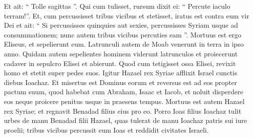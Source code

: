 \begin{biblechapter}
\begin{biblechapter}
\begin{biblechapter}
\begin{biblechapter}
\begin{biblechapter}
\begin{biblechapter}
\begin{biblechapter}
\begin{biblechapter}
\begin{biblechapter}
\begin{biblechapter}
\begin{biblechapter}
\begin{biblechapter}
\begin{biblechapter}
\verse Et ait: “ Tolle sagittas ”. Qui cum tulisset, rursum dixit ei: “ Percute iaculo terram!”. Et, cum percussisset tribus vicibus et stetisset, 
\verse iratus est contra eum vir Dei et ait: “ Si percussisses quinquies aut sexies, percussisses Syriam usque ad consummationem; nunc autem tribus vicibus percuties eam ”.
 \verse Mortuus est ergo Eliseus, et sepelierunt eum. Latrunculi autem de Moab venerunt in terra in ipso anno. 
\verse Quidam autem sepelientes hominem viderunt latrunculos et proiecerunt cadaver in sepulcro Elisei et abierunt. Quod cum tetigisset ossa Elisei, revixit homo et stetit super pedes suos.
 \verse Igitur Hazael rex Syriae afflixit Israel cunctis diebus Ioachaz. 
\verse Et misertus est Dominus eorum et reversus est ad eos propter pactum suum, quod habebat cum Abraham, Isaac et Iacob, et noluit disperdere eos neque proicere penitus usque in praesens tempus. 
\verse Mortuus est autem Hazael rex Syriae; et regnavit Benadad filius eius pro eo. 
\verse Porro Ioas filius Ioachaz tulit urbes de manu Benadad filii Hazael, quas tulerat de manu Ioachaz patris sui iure proelii; tribus vicibus percussit eum Ioas et reddidit civitates Israeli.
 

\end{biblechapter}
\end{biblechapter}
\end{biblechapter}
\end{biblechapter}
\end{biblechapter}
\end{biblechapter}
\end{biblechapter}
\end{biblechapter}
\end{biblechapter}
\end{biblechapter}
\end{biblechapter}
\end{biblechapter}
\end{biblechapter}
